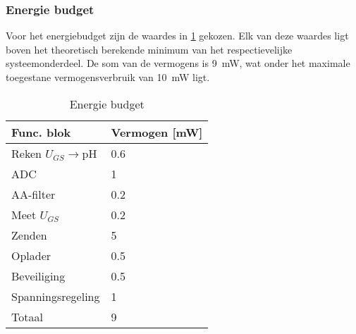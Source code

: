 \subsubsection{Energie budget}\label{sec:energyBudgets}
Voor het energiebudget zijn de waardes in \cref{tab:energieBudgetEstimatie} gekozen. Elk van deze waardes ligt boven het theoretisch berekende minimum van het respectievelijke systeemonderdeel. De som van de vermogens is \qty{9}{\milli\watt}, wat onder het maximale toegestane vermogensverbruik van \qty{10}{\milli\watt} ligt.


\begin{table}[!htbp]
    \centering
    \begin{tabular}{l|l}
        Func. blok          & Vermogen [mW] \\
        \hline
        Reken $U_{GS}\rightarrow$pH & 0.6   \\
        ADC                 & 1             \\
        AA-filter           & 0.2           \\
        Meet $U_{GS}$       & 0.2           \\
        Zenden              & 5             \\
        Oplader             & 0.5           \\
        Beveiliging         & 0.5           \\
        Spanningsregeling   & 1             \\
        \hline
        \hline
        Totaal              & 9

    \end{tabular}
    \caption{Energie budget}
    \label{tab:energieBudgetEstimatie}
\end{table}


